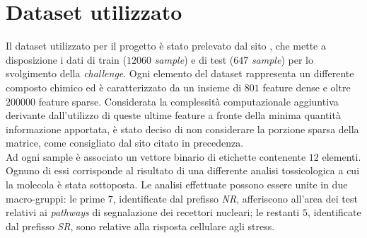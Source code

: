 \section{Dataset utilizzato}
Il dataset utilizzato per il progetto è stato prelevato dal sito \cite{dataset_site}, che mette a disposizione i dati di train ($12060$ \textit{sample}) e di test ($647$ \textit{sample}) per lo svolgimento della \textit{challenge}.
Ogni elemento del dataset rappresenta un differente composto chimico ed è caratterizzato da un insieme di $801$ feature dense e oltre $200000$ feature sparse. Considerata la complessità computazionale aggiuntiva derivante dall'utilizzo di queste ultime feature a fronte della minima quantità informazione apportata, è stato deciso di non considerare la porzione sparsa della matrice, come consigliato dal sito citato in precedenza.\\
Ad ogni sample è associato un vettore binario di etichette contenente $12$ elementi. Ognuno di essi corrisponde al risultato di una differente analisi tossicologica a cui la molecola è stata sottoposta. Le analisi effettuate possono essere unite in due macro-gruppi: le prime $7$, identificate dal prefisso \textit{NR}, afferiscono all'area dei test relativi ai \textit{pathways} di segnalazione dei recettori nucleari; le restanti $5$, identificate dal prefisso \textit{SR}, sono relative alla risposta cellulare agli stress.\\


